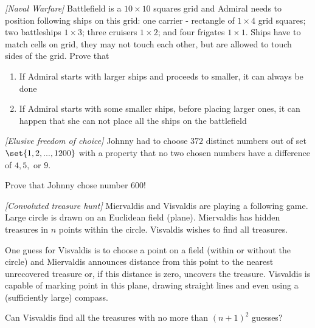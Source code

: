 

%

\renewcommand{\theenumi}{\alph{enumi}}








\noindent 

\begin{problem}
\textit{[Naval Warfare]}
Battlefield is a $10 \times 10$ squares grid and Admiral needs to position following ships on this grid: one carrier - rectangle of $1 \times 4$ grid squares; two battleships $1\times3$; three cruisers $1\times2$; and four frigates $1\times1$. Ships have to match cells on grid, they may not touch each other, but are allowed to touch sides of the grid. Prove that
\begin{enumerate}
\item If Admiral starts with larger ships and proceeds to smaller, it can always be done
\item If Admiral starts with some smaller ships, before placing larger ones, it can happen that she can not place all the ships on the battlefield
\end{enumerate}
\end{problem}
%

\begin{problem}
\textit{[Elusive freedom of choice]}
Johnny had to choose $372$ distinct numbers out of set $\set{1,2,...,1200}$ with a property that no two chosen numbers have a difference of $4,5,$ or $9$. 

Prove that Johnny chose number $600$! 
\end{problem}
%

%
%

\begin{problem}
\textit{[Convoluted treasure hunt]}
Miervaldis and Visvaldis are playing a following game. Large circle is drawn on an Euclidean field (plane). Miervaldis has hidden treasures in $n$ points within the circle. Visvaldis wishes to find all treasures.

One guess for Visvaldis is to choose a point on a field (within or without the circle) and Miervaldis announces distance from this point to the nearest unrecovered treasure or, if this distance is zero, uncovers the treasure. Visvaldis is capable of marking point in this plane, drawing straight lines and even using a (sufficiently large) compass.

Can Visvaldis find all the treasures with no more than $(n+1)^2$ guesses? 
\end{problem}
%

